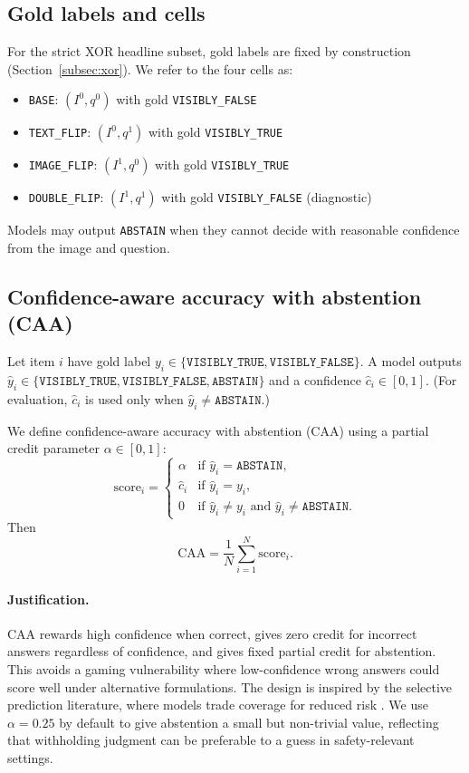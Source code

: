 \documentclass[11pt]{article}
\begin{document}
\subsection{Gold labels and cells}

For the strict XOR headline subset, gold labels are fixed by construction (Section~\ref{subsec:xor}). We refer to the four cells as:
\begin{itemize}[noitemsep, topsep=3pt]
  \item \texttt{BASE}: \((I^0, q^0)\) with gold \texttt{VISIBLY\_FALSE}
  \item \texttt{TEXT\_FLIP}: \((I^0, q^1)\) with gold \texttt{VISIBLY\_TRUE}
  \item \texttt{IMAGE\_FLIP}: \((I^1, q^0)\) with gold \texttt{VISIBLY\_TRUE}
  \item \texttt{DOUBLE\_FLIP}: \((I^1, q^1)\) with gold \texttt{VISIBLY\_FALSE} (diagnostic)
\end{itemize}

Models may output \texttt{ABSTAIN} when they cannot decide with reasonable confidence from the image and question.

\subsection{Confidence-aware accuracy with abstention (CAA)}
\label{subsec:caa}

Let item \(i\) have gold label \(y_i \in \{\texttt{VISIBLY\_TRUE}, \texttt{VISIBLY\_FALSE}\}\). A model outputs \(\hat{y}_i \in \{\texttt{VISIBLY\_TRUE}, \texttt{VISIBLY\_FALSE}, \texttt{ABSTAIN}\}\) and a confidence \(\hat{c}_i \in [0,1]\). (For evaluation, \(\hat{c}_i\) is used only when \(\hat{y}_i \neq \texttt{ABSTAIN}\).)

We define confidence-aware accuracy with abstention (CAA) using a partial credit parameter \(\alpha \in [0,1]\):
\[
\text{score}_i =
\begin{cases}
\alpha & \text{if } \hat{y}_i=\texttt{ABSTAIN},\\
\hat{c}_i & \text{if } \hat{y}_i=y_i,\\
0 & \text{if } \hat{y}_i\neq y_i \text{ and } \hat{y}_i\neq \texttt{ABSTAIN}.
\end{cases}
\]
Then
\[
\text{CAA}=\frac{1}{N}\sum_{i=1}^{N}\text{score}_i.
\]

\paragraph{Justification.}
CAA rewards high confidence when correct, gives zero credit for incorrect answers regardless of confidence, and gives fixed partial credit for abstention. This avoids a gaming vulnerability where low-confidence wrong answers could score well under alternative formulations. The design is inspired by the selective prediction literature, where models trade coverage for reduced risk \citep{elyaniv_selective_2010,geifman_selectivenet_2019}. We use \(\alpha=0.25\) by default to give abstention a small but non-trivial value, reflecting that withholding judgment can be preferable to a guess in safety-relevant settings.
\end{document}
